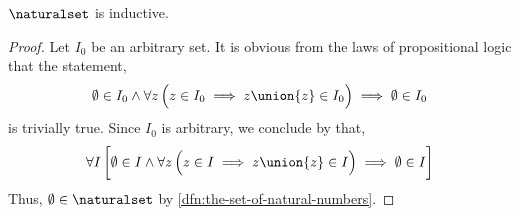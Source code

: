 \begin{thm}
    \label{thm:the-set-of-all-natural-numbers-is-inductive}
    \( \naturalset \) is inductive.
\end{thm}

\begin{proof}
    Let \( I_{0} \) be an arbitrary set. It is obvious from the laws of propositional logic that the statement,
    \begin{equation*}
        \emptyset \in I_{0} \land \forall z \, \Big( z \in I_{0} \implies z \union \mleft\{ z \mright\} \in I_{0} \Big) \implies \emptyset \in I_{0}
    \end{equation*}
    is trivially true. Since \( I_{0} \) is arbitrary, we conclude by  that,
    \begin{equation*}
        \forall I \, \bigg[ \emptyset \in I \land \forall z \, \Big( z \in I \implies z \union \mleft\{ z \mright\} \in I \Big)
        \implies \emptyset \in I \bigg]
    \end{equation*}
    Thus, \( \emptyset \in \naturalset \) by \cref{dfn:the-set-of-natural-numbers}.


\end{proof}
